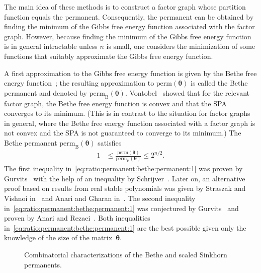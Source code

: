 \documentclass[journal,lettersize,twocolumn]{IEEEtran} %
\newcommand{\matr}[1]{ \bm{#1} }
\newcommand{\perm}{ \mathrm{perm} }
\newcommand{\permb}{ \mathrm{perm}_{\mathrm{B}} }
\newcommand{\mtheta}{\matr{\theta}}
\begin{document}
%

The main idea of these methods is to construct a factor graph whose partition
function equals the permanent. Consequently, the permanent can be obtained by
finding the minimum of the Gibbs free energy function associated with the
factor graph. However, because finding the minimum of the Gibbs free energy
function is in general intractable unless $n$ is small, one considers the
minimization of some functions that suitably approximate the Gibbs free energy
function.

%

A first approximation to the Gibbs free energy function is given by the Bethe
free energy function~\cite{Yedidia2005}; the resulting approximation to
$\perm(\mtheta)$ is called the Bethe permanent and denoted by
$ \permb(\mtheta)$. Vontobel~\cite{Vontobel2013a} showed that for the relevant
factor graph, the Bethe free energy function is convex and that the SPA
converges to its minimum. (This is in contrast to the situation for factor
graphs in general, where the Bethe free energy function associated with a
factor graph is not convex and the SPA is not guaranteed to converge to its
minimum.) The Bethe permanent $\permb(\mtheta)$ satisfies
\begin{align}
  1 
    &\leq 
       \frac{\perm(\mtheta)}{ \permb(\mtheta)} 
     \leq 
        2^{n/2}.
        \label{eq:ratio:permanent:bethe:permanent:1}
\end{align}
The first inequality in~\eqref{eq:ratio:permanent:bethe:permanent:1} was
proven by Gurvits~\cite{Gurvits2011} with the help of an inequality by
Schrijver~\cite{Schrijver1998}. Later on, an alternative proof based on
results from real stable polynomials was given by Straszak and Vishnoi
in~\cite{Straszak2019} and Anari and Gharan in~\cite{Anari2021}. The second
inequality in~\eqref{eq:ratio:permanent:bethe:permanent:1} was conjectured by
Gurvits~\cite{Gurvits2011} and proven by Anari and
Rezaei~\cite{Anari2019}. Both inequalities
in~\eqref{eq:ratio:permanent:bethe:permanent:1} are the best possible given
only the knowledge of the size of the matrix~$\mtheta$.

%

\begin{figure}[t]
  \begin{center}
    \hspace{-2.25cm}
    \hspace{-1.75cm}
  \end{center}
  \caption{Combinatorial characterizations of the 
    Bethe and scaled Sinkhorn permanents.}
  \label{fig:combinatorial:characterization:1}
  \vspace{0.00cm} %
\end{figure}
\end{document}
